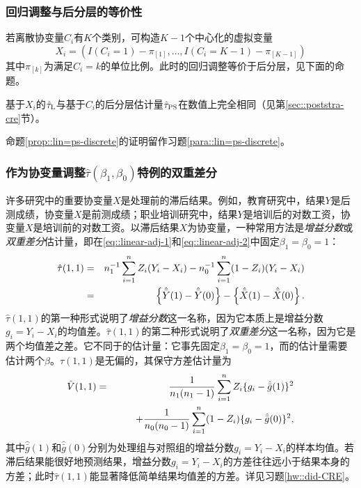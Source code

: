  \subsubsection{回归调整与后分层的等价性}若离散协变量$C_i$有$K$个类别，可构造$K-1$个中心化的虚拟变量
$$
X_i = ( I(C_i=1) - \pi_{[1]}, \ldots,   I(C_i=K-1) - \pi_{[K-1]})
$$
其中$\pi_{[k]}$为满足$C_i = k$的单位比例。此时\citet{lin2013}的回归调整等价于后分层，见下面的命题。 

\begin{proposition}
\label{prop::lin=ps-discrete}
基于$X_i$的$\hat{\tau}_\textsc{L}$与基于$C_i$的后分层估计量$\hat{\tau}_\textsc{PS}$在数值上完全相同（见第\ref{sec::poststra-cre}节）。 
\end{proposition}


命题\ref{prop::lin=ps-discrete}的证明留作习题\ref{para::lin=ps-discrete}。 


\subsubsection{作为协变量调整$\hat \tau(\beta_1, \beta_0)$特例的双重差分}\label{sec::difference-in-difference-CRE}
许多研究中的重要协变量$X$是处理前的滞后结果。例如，教育研究中，结果$Y$是后测成绩，协变量$X$是前测成绩；职业培训研究中，结果$Y$是培训后的对数工资，协变量$X$是培训前的对数工资。以滞后结果$X$为协变量，一种常用方法是{\it 增益分数}或{\it 双重差分}估计量，即在\eqref{eq::linear-adj-1}和\eqref{eq::linear-adj-2}中固定$\beta_1 = \beta_0=1$：
\begin{eqnarray*}
\hat{\tau}(1,1) &=& n_1^{-1} \sum_{i=1}^n Z_i(Y_i -   X_i) - n_0^{-1} \sum_{i=1}^n (1-Z_i) (Y_i -   X_i) \\
&=& \left\{   \hat{\bar{Y}}(1) - \hat{\bar{Y}}(0) \right\} -  \left\{   \hat{\bar{X} }(1) - \hat{\bar{X} }(0) \right\} .
\end{eqnarray*}
$\hat{\tau}(1,1) $的第一种形式说明了{\it 增益分数}这一名称，因为它本质上是增益分数$g_i = Y_i - X_i$的均值差。$\hat{\tau}(1,1) $的第二种形式说明了{\it 双重差分}这一名称，因为它是两个均值差之差。它不同于\citet{lin2013}的估计量：它事先固定$\beta_1 = \beta_0=1$，而\citet{lin2013}的估计量需要估计两个$\beta$。$\hat{\tau}(1,1) $是无偏的，其保守方差估计量为
\begin{eqnarray*}
\hat{V}( 1,1 ) 
&=& \frac{1}{n_1(n_1 - 1)} \sum_{i=1}^n Z_i  \{ g_i - \hat{\bar{g}}(1)   \}^2 \\
& & \qquad + \frac{1}{n_0(n_0 - 1)} \sum_{i=1}^n (1-Z_i)  \{ g_i - \hat{\bar{g}}(0)   \}^2,
\end{eqnarray*}
其中$\hat{\bar{g}}(1)$和$ \hat{\bar{g}}(0)$分别为处理组与对照组的增益分数$g_i = Y_i - X_i$的样本均值。若滞后结果能很好地预测结果，增益分数$g_i = Y_i - X_i$的方差往往远小于结果本身的方差；此时$\hat{\tau}(1,1) $能显著降低简单结果均值差的方差。详见习题\ref{hw::did-CRE}。 


